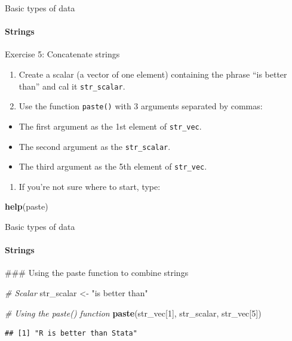 \documentclass[ignorenonframetext,]{beamer}
\newenvironment{Shaded}{\begin{snugshade}}{\end{snugshade}}
\newcommand{\KeywordTok}[1]{\textcolor[rgb]{0.13,0.29,0.53}{\textbf{#1}}}
\newcommand{\DecValTok}[1]{\textcolor[rgb]{0.00,0.00,0.81}{#1}}
\newcommand{\StringTok}[1]{\textcolor[rgb]{0.31,0.60,0.02}{#1}}
\newcommand{\CommentTok}[1]{\textcolor[rgb]{0.56,0.35,0.01}{\textit{#1}}}
\newcommand{\NormalTok}[1]{#1}
\providecommand{\tightlist}{%
  \setlength{\itemsep}{0pt}\setlength{\parskip}{0pt}}
\begin{document}
\begin{frame}[fragile]{Basic types of data}

\framesubtitle{Strings}

\begin{block}{Exercise 5: Concatenate strings}

\begin{enumerate}
\def\labelenumi{\arabic{enumi}.}
\tightlist
\item
  Create a scalar (a vector of one element) containing the phrase ``is
  better than'' and cal it \texttt{str\_scalar}.
\item
  Use the function \texttt{paste()} with 3 arguments separated by
  commas:
\end{enumerate}

\begin{itemize}
\tightlist
\item
  The first argument as the 1st element of \texttt{str\_vec}.
\item
  The second argument as the \texttt{str\_scalar}.
\item
  The third argument as the 5th element of \texttt{str\_vec}.
\end{itemize}

\begin{enumerate}
\def\labelenumi{\arabic{enumi}.}
\setcounter{enumi}{2}
\tightlist
\item
  If you're not sure where to start, type:
\end{enumerate}

\begin{Shaded}
\begin{Highlighting}[]
\KeywordTok{help}\NormalTok{(paste)}
\end{Highlighting}
\end{Shaded}

\end{block}

\end{frame}

\begin{frame}[fragile]{Basic types of data}

\framesubtitle{Strings}

\begin{Shaded}
\begin{Highlighting}[]
\NormalTok{### Using the paste function to combine strings}

\CommentTok{# Scalar}
\NormalTok{str_scalar <-}\StringTok{ "is better than"}

\CommentTok{# Using the paste() function}
\KeywordTok{paste}\NormalTok{(str_vec[}\DecValTok{1}\NormalTok{], str_scalar, str_vec[}\DecValTok{5}\NormalTok{])}
\end{Highlighting}
\end{Shaded}

\begin{verbatim}
## [1] "R is better than Stata"
\end{verbatim}

\end{frame}
\end{document}
